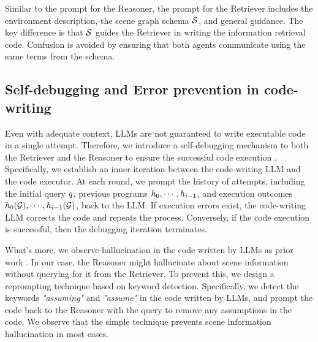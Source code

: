Similar to the prompt for the Reasoner, the prompt for the  Retriever includes the environment description, the scene graph schema ${\mathcal{S}}$, and general guidance. The key difference is that ${\mathcal{S}}$ guides the Retriever in writing the information retrieval code. Confusion is avoided by ensuring that both agents communicate using the same terms from the schema.

\subsection{Self-debugging and Error prevention in code-writing} 

Even with adequate context, LLMs are not guaranteed to write executable code in a single attempt. Therefore, we introduce a self-debugging mechanism to both the Retriever and the Reasoner to ensure the successful code execution \citep{selfdebug}. Specifically, we establish an inner iteration between the code-writing LLM and the code executor. At each round, we prompt the history of attempts, including the initial query $q$, previous programs ${h_{0}, \cdots, h_{i-1}}$, and execution outcomes ${h_{0}({\mathcal{G}}), \cdots, h_{i-1}({\mathcal{G}})}$, back to the LLM. If execution errors exist, the code-writing LLM corrects the code and repeats the process. Conversely, if the code execution is successful, then the debugging iteration terminates.

What's more, we observe hallucination in the code written by LLMs as prior work \citep{liu2024exploring}. In our case, the Reasoner might hallucinate about scene information without querying for it from the Retriever. To prevent this, we design a reprompting technique based on keyword detection. Specifically, we detect the keywords \textit{"assuming"} and \textit{"assume"} in the code written by LLMs, and prompt the code back to the Reasoner with the query to remove any assumptions in the code. We observe that the simple technique prevents scene information hallucination in most cases.